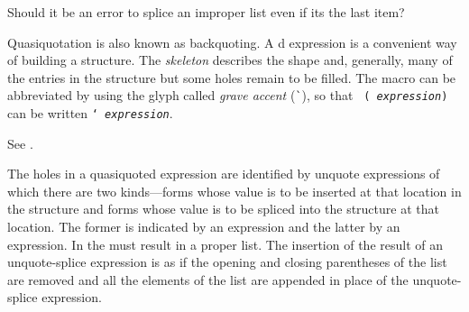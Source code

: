 \gdef\module{syntax-0}
\label{backquote}
%
\begin{optPrivate}
    Should it be an error to splice an improper list even if its the last item?
\end{optPrivate}
%
\begin{optDefinition}

%
\Syntax
{}%
%
\remarks%
Quasiquotation is also known as backquoting.  A d
expression is a convenient way of building a structure.  The {\em skeleton}
describes the shape and, generally, many of the entries in the structure but
some holes remain to be filled.  The  macro can be
abbreviated by using the glyph called {\em grave accent}
(\verb+`+), so that {\tt
    ( {\em expression})} can be written {\tt `{\em
        expression}}.

\Syntax
{}%
%
\remarks%
See .

\Syntax
{}%
%
\remarks%
The holes in a quasiquoted expression are identified by unquote expressions of
which there are two kinds---forms whose value is to be inserted at that location
in the structure and forms whose value is to be spliced into the structure at
that location.  The former is indicated by an  expression and
the latter by an  expression.  In
 the  must result in a proper list.  The
insertion of the result of an unquote-splice expression is as if the opening and
closing parentheses of the list are removed and all the elements of the list are
appended in place of the unquote-splice expression.


\end{optDefinition}
